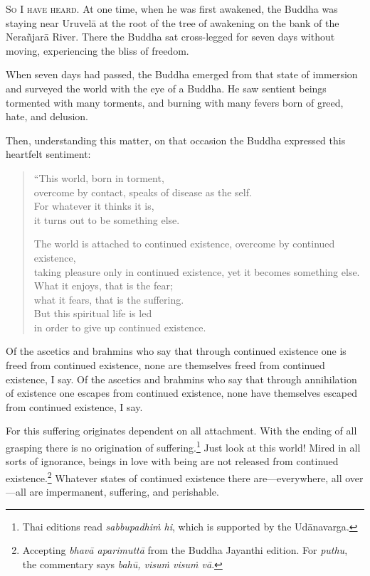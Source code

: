\documentclass[12pt,openany]{book}%
\newcommand*{\scevam}[1]{\textsc{#1}}
\begin{document}
\scevam{So I have heard. }At one time, when he was first awakened, the Buddha was staying near \textsanskrit{Uruvelā} at the root of the tree of awakening on the bank of the \textsanskrit{Nerañjarā} River. There the Buddha sat cross-legged for seven days without moving, experiencing the bliss of freedom. 

When seven days had passed, the Buddha emerged from that state of immersion and surveyed the world with the eye of a Buddha. He saw sentient beings tormented with many torments, and burning with many fevers born of greed, hate, and delusion. 

Then, understanding this matter, on that occasion the Buddha expressed this heartfelt sentiment: 

\begin{verse}%
“This world, born in torment, \\
overcome by contact, speaks of disease as the self. \\
For whatever it thinks it is, \\
it turns out to be something else. 

The world is attached to continued existence, overcome by continued existence, \\
taking pleasure only in continued existence, yet it becomes something else. \\
What it enjoys, that is the fear; \\
what it fears, that is the suffering. \\
But this spiritual life is led \\
in order to give up continued existence. 

%
\end{verse}

Of the ascetics and brahmins who say that through continued existence one is freed from continued existence, none are themselves freed from continued existence, I say. Of the ascetics and brahmins who say that through annihilation of existence one escapes from continued existence, none have themselves escaped from continued existence, I say. 

For this suffering originates dependent on all attachment. With the ending of all grasping there is no origination of suffering.\footnote{Thai editions read \textit{\textsanskrit{sabbupadhiṁ} hi}, which is supported by the \textsanskrit{Udānavarga}. } Just look at this world! Mired in all sorts of ignorance, beings in love with being are not released from continued existence.\footnote{Accepting \textit{\textsanskrit{bhavā} \textsanskrit{aparimuttā}} from the Buddha Jayanthi edition. For \textit{puthu}, the commentary says \textit{\textsanskrit{bahū}, \textsanskrit{visuṁ} \textsanskrit{visuṁ} \textsanskrit{vā}}. } Whatever states of continued existence there are—everywhere, all over—all are impermanent, suffering, and perishable. 
\end{document}
